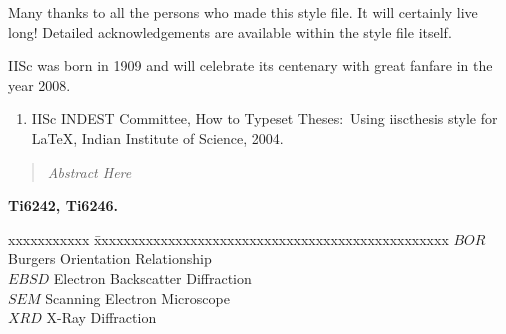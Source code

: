 \documentclass[12pt]{iiscthes} %
\begin{document}
\begin{frontmatter}
Many thanks to all the persons who made this style file. It will certainly
live long! Detailed acknowledgements are available within the style file itself.

\vita
IISc was born in 1909 and will celebrate its centenary with great fanfare
in the year 2008.
\publications

\begin{enumerate}
\item IISc INDEST Committee,  How to Typeset Theses:~Using iiscthesis
style for \LaTeX, Indian Institute of Science, 2004.
\end{enumerate}

\begin{abstract}
\sl
Abstract Here
	
\end{abstract}



\makecontents

\keywords
{\large\bf{
Ti6242, Ti6246.
}}

\vspace{10MM}
\notations
\begin{singlespace}
\begin{tabbing}
xxxxxxxxxxx \= xxxxxxxxxxxxxxxxxxxxxxxxxxxxxxxxxxxxxxxxxxxxxxxx \kill
\textbf{$BOR$}   \> Burgers Orientation Relationship \\
\textbf{$EBSD$}  \> Electron Backscatter Diffraction  \\
\textbf{$SEM$}   \> Scanning Electron Microscope \\
\textbf{$XRD$}   \> X-Ray Diffraction \\
\end{tabbing}
\end{singlespace}
\end{frontmatter}
\end{document}
